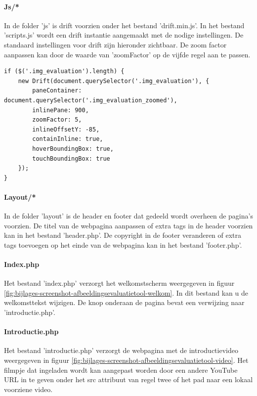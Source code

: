 \paragraph{Js/*}
\label{sec:onderzoek-evaluatietool-setup-js}

In de folder 'js' is \gls{drift} voorzien onder het bestand 'drift.min.js'. In het bestand 'scripts.js' wordt een \gls{drift} instantie aangemaakt met de nodige instellingen. De standaard instellingen voor drift zijn hieronder zichtbaar. De zoom factor aanpassen kan door de waarde van 'zoomFactor' op de vijfde regel aan te passen.

\begin{lstlisting}[style=htmlcssjs]
if ($('.img_evaluation').length) {
	new Drift(document.querySelector('.img_evaluation'), {
		paneContainer: document.querySelector('.img_evaluation_zoomed'),
		inlinePane: 900,
		zoomFactor: 5,
		inlineOffsetY: -85,
		containInline: true,
		hoverBoundingBox: true,
		touchBoundingBox: true
	});
}
\end{lstlisting}

\paragraph{Layout/*}
\label{sec:onderzoek-evaluatietool-setup-layout}

In de folder 'layout' is de header en footer dat gedeeld wordt overheen de pagina's voorzien. De titel van de webpagina aanpassen of extra tags in de header voorzien kan in het bestand 'header.php'. De copyright in de footer veranderen of extra tags toevoegen op het einde van de webpagina kan in het bestand 'footer.php'.

\paragraph{Index.php}
\label{sec:onderzoek-evaluatietool-setup-index}

Het bestand 'index.php' verzorgt het welkomstscherm weergegeven in figuur \ref{fig:bijlages-screenshot-afbeeldingsevaluatietool-welkom}. In dit bestand kan u de welkomsttekst wijzigen. De knop onderaan de pagina bevat een verwijzing naar 'introductie.php'.

\paragraph{Introductie.php}
\label{sec:onderzoek-evaluatietool-setup-introductie}

Het bestand 'introductie.php' verzorgt de webpagina met de introductievideo weergegeven in figuur \ref{fig:bijlages-screenshot-afbeeldingsevaluatietool-video}. Het filmpje dat ingeladen wordt kan aangepast worden door een andere YouTube URL in te geven onder het src attribuut van regel twee of het pad naar een lokaal voorziene video.

